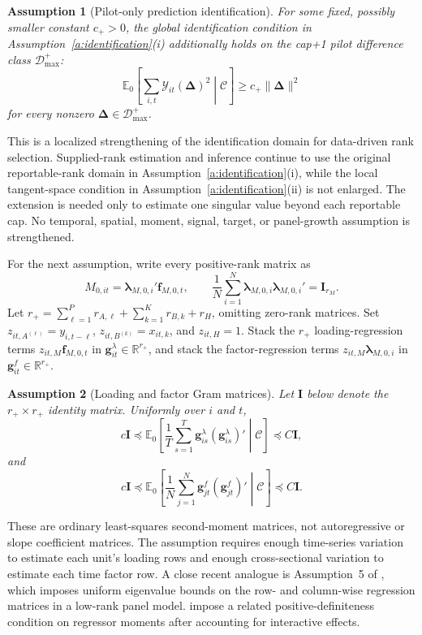 \documentclass[11pt]{article}
\numberwithin{equation}{section}
\newtheorem{assumption}{Assumption}
\theoremstyle{remark}
\newcommand{\R}{\mathbb R}
\newcommand{\Ezero}{\mathbb E_0}
\newcommand{\bDelta}{\bm\Delta}
\newcommand{\calD}{\mathcal D}
\begin{document}
\begin{assumption}[Pilot-only prediction identification]
\label{a:pilot_identification}
For some fixed, possibly smaller constant $c_+>0$, the global identification condition in Assumption~\ref{a:identification}(i) additionally holds on the cap+1 pilot difference class $\calD_{\max}^{+}$:
\[
\Ezero\!\left[
\sum_{i,t}\mathcal Y_{it}(\bDelta)^2
\middle|\mathscr C
\right]
\ge
c_+\|\bDelta\|^2
\]
for every nonzero $\bDelta\in\calD_{\max}^{+}$.
\end{assumption}
This is a localized strengthening of the identification domain for data-driven rank selection. Supplied-rank estimation and inference continue to use the original reportable-rank domain in Assumption~\ref{a:identification}(i), while the local tangent-space condition in Assumption~\ref{a:identification}(ii) is not enlarged. The extension is needed only to estimate one singular value beyond each reportable cap. No temporal, spatial, moment, signal, target, or panel-growth assumption is strengthened.

For the next assumption, write every positive-rank matrix as
$$
M_{0,it}=\bm\lambda_{M,0,i}'\bm f_{M,0,t},
\qquad
\frac1N\sum_{i=1}^{N}\bm\lambda_{M,0,i}\bm\lambda_{M,0,i}'=\bm I_{r_M}.
$$
Let $r_+=\sum_{\ell=1}^{P}r_{A,\ell}+\sum_{k=1}^{K}r_{B,k}+r_H$, omitting zero-rank matrices. Set $z_{it,A^{(\ell)}}=y_{i,t-\ell}$, $z_{it,B^{(k)}}=x_{it,k}$, and $z_{it,H}=1$. Stack the $r_+$ loading-regression terms $z_{it,M}\bm f_{M,0,t}$ in $\bm g_{it}^{\lambda}\in\R^{r_+}$, and stack the factor-regression terms $z_{it,M}\bm\lambda_{M,0,i}$ in $\bm g_{it}^{f}\in\R^{r_+}$.

\begin{assumption}[Loading and factor Gram matrices]
\label{a:gram}
Let $\bm I$ below denote the $r_+\times r_+$ identity matrix. Uniformly over $i$ and $t$,
$$
c\bm I
\preceq
\Ezero\!\left[
\frac1T\sum_{s=1}^{T}
\bm g_{is}^{\lambda}(\bm g_{is}^{\lambda})'
\middle|\mathscr C
\right]
\preceq
C\bm I,
$$
and
$$
c\bm I
\preceq
\Ezero\!\left[
\frac1N\sum_{j=1}^{N}
\bm g_{jt}^{f}(\bm g_{jt}^{f})'
\middle|\mathscr C
\right]
\preceq
C\bm I.
$$
\end{assumption}
These are ordinary least-squares second-moment matrices, not autoregressive or slope coefficient matrices. The assumption requires enough time-series variation to estimate each unit's loading rows and enough cross-sectional variation to estimate each time factor row. A close recent analogue is Assumption~5 of \citet{wangsu2022}, which imposes uniform eigenvalue bounds on the row- and column-wise regression matrices in a low-rank panel model. \citet{pengetal2025} impose a related positive-definiteness condition on regressor moments after accounting for interactive effects.
\end{document}
